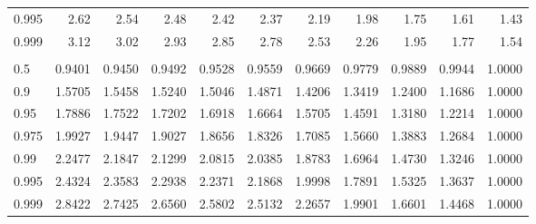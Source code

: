 \documentclass[]{article}
\begin{document}
\begin{table}[H]
\begin{tabular}{lrrrrrrrrrr}
\hspace{1em}0.995 & 2.62 & 2.54 & 2.48 & 2.42 & 2.37 & 2.19 & 1.98 & 1.75 & 1.61 & 1.43\\
\hspace{1em}0.999 & 3.12 & 3.02 & 2.93 & 2.85 & 2.78 & 2.53 & 2.26 & 1.95 & 1.77 & 1.54\\
\addlinespace[0.3em]
\multicolumn{11}{l}{$k_2=\infty$}\\
\hspace{1em}0.5 & 0.9401 & 0.9450 & 0.9492 & 0.9528 & 0.9559 & 0.9669 & 0.9779 & 0.9889 & 0.9944 & 1.0000\\
\hspace{1em}0.9 & 1.5705 & 1.5458 & 1.5240 & 1.5046 & 1.4871 & 1.4206 & 1.3419 & 1.2400 & 1.1686 & 1.0000\\
\hspace{1em}0.95 & 1.7886 & 1.7522 & 1.7202 & 1.6918 & 1.6664 & 1.5705 & 1.4591 & 1.3180 & 1.2214 & 1.0000\\
\hspace{1em}0.975 & 1.9927 & 1.9447 & 1.9027 & 1.8656 & 1.8326 & 1.7085 & 1.5660 & 1.3883 & 1.2684 & 1.0000\\
\hspace{1em}0.99 & 2.2477 & 2.1847 & 2.1299 & 2.0815 & 2.0385 & 1.8783 & 1.6964 & 1.4730 & 1.3246 & 1.0000\\
\hspace{1em}0.995 & 2.4324 & 2.3583 & 2.2938 & 2.2371 & 2.1868 & 1.9998 & 1.7891 & 1.5325 & 1.3637 & 1.0000\\
\hspace{1em}0.999 & 2.8422 & 2.7425 & 2.6560 & 2.5802 & 2.5132 & 2.2657 & 1.9901 & 1.6601 & 1.4468 & 1.0000\\
\bottomrule
\end{tabular}
\end{table}
\end{document}

